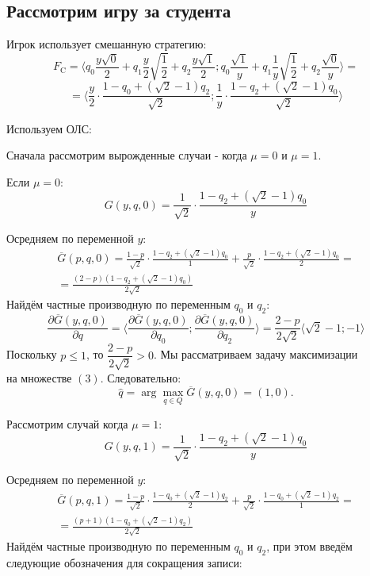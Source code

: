 \subsection{Рассмотрим игру за студента}
\begin{flushleft}
	Игрок использует смешанную стратегию:\\
	
	$$
		F_\textrm{C}=
		\big \langle
			q_0\frac{y\sqrt{0}}{2} + 
			q_1\frac{y}{2} \sqrt{\frac{1}{2}} + 
			q_2\frac{y\sqrt{1}}{2};
			q_0\frac{\sqrt{1}}{y} +
			q_1\frac{1}{y} \sqrt{\frac{1}{2}} +
			q_2\frac{\sqrt{0}}{y}
		\big \rangle = 
	$$
	$$
		=\big \langle
			\frac{y}{2}\cdot\frac{1-q_0+(\sqrt{2}-1)q_2}{\sqrt{2}};
			\frac{1}{y}\cdot\frac{1-q_2+(\sqrt{2}-1)q_0}{\sqrt{2}}
		\big \rangle
	$$	
	
	Используем ОЛС:
	
	Сначала рассмотрим вырожденные случаи - когда $\mu=0$ и  $\mu=1$. 


	\textbf{} Если $\mu=0$:
	$$
		G(y,q,0)=\frac{1}{\sqrt{2}}\cdot \frac{1-q_2+(\sqrt{2}-1)q_0}{y}
	$$	
	
	Осредняем по переменной $y$:
	\begin{gather*}
		\overline G(p,q,0)=
		\frac{1-p}{\sqrt{2}} \cdot \frac{1-q_2+(\sqrt{2}-1)q_0}{1}+
		\frac{p}{\sqrt{2}} \cdot \frac{1-q_2+(\sqrt{2}-1)q_0}{2}=\\
		=\frac{(2-p)(1-q_2+(\sqrt{2}-1)q_0)}{2\sqrt{2}}
	\end{gather*}
	Найдём частные производную по переменным $q_0$ и $q_2$:
	$$
		\frac{\partial \overline G(y,q,0)}{\partial q}
		=\langle \frac{\partial \overline G(y,q,0)}{\partial q_0};
		\frac{\partial \overline G(y,q,0)}{\partial q_2} \rangle
		=\frac{2-p}{2\sqrt{2}} \langle \sqrt{2}-1;-1\rangle
	$$
	Поскольку $p \leqslant 1$, то $\dfrac{2-p}{2\sqrt{2}} > 0 $.
	Мы рассматриваем задачу максимизации \\ на множестве $(3)$.
	Следовательно:
	$$\hat q = \arg \max \limits_{q \in Q} \overline G(y,q,0)=(1,0).$$

	
	\textbf{} Рассмотрим случай когда $\mu=1:$
	$$
		G(y,q,1)=\frac{1}{\sqrt{2}}\cdot \frac{1-q_2+(\sqrt{2}-1)q_0}{y}
	$$	
	
	Осредняем по переменной $y$:
	\begin{gather*}
		\overline G(p,q,1)=
		\frac{1-p}{\sqrt{2}} \cdot \frac{1-q_0+(\sqrt{2}-1)q_2}{2}+
		\frac{p}{\sqrt{2}} \cdot \frac{1-q_0+(\sqrt{2}-1)q_2}{1}=\\
		=\frac{(p+1)(1-q_0+(\sqrt{2}-1)q_2)}{2\sqrt{2}}
	\end{gather*}
	Найдём частные производную по переменным $q_0$ и $q_2$, при этом
	введём следующие обозначения для сокращения записи:
	

\end{flushleft}
